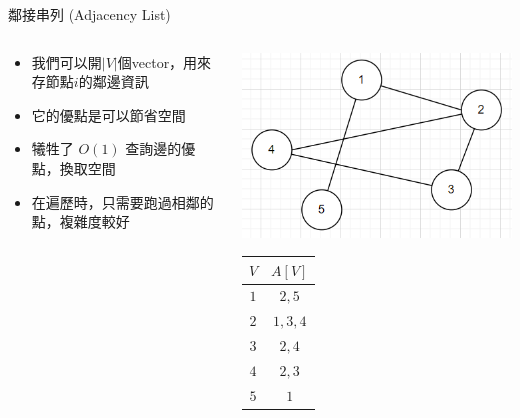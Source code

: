 \documentclass[aspectratio=169]{beamer}
\begin{document}
    \begin{frame}{鄰接串列 (Adjacency List)}
    \begin{columns}
    \begin{column}{0.6\textwidth}
        \begin{itemize}
            \item 我們可以開$|V|$個vector，用來存節點$i$的鄰邊資訊
            \item 它的優點是可以節省空間
            \item 犧牲了 $O(1)$ 查詢邊的優點，換取空間
            \item 在遍歷時，只需要跑過相鄰的點，複雜度較好
        \end{itemize}
    \end{column}
    \begin{column}{0.4\textwidth}
        \begin{center}
            \includegraphics[scale=0.3]{images/Adjacency Matrix.png}
        \end{center}
        \begin{center}
        \begin{tabular}{|c|c|}
                                \hline
            $V$ &  $A[V]$    \\ \hline
            $1$ &  $2, 5$    \\ \hline
            $2$ &  $1, 3, 4$ \\ \hline
            $3$ &  $2, 4$    \\ \hline
            $4$ &  $2, 3$    \\ \hline
            $5$ &  $1$       \\ \hline
        \end{tabular}
        \end{center}
    \end{column}
    \end{columns}
    \end{frame}
    
\end{document}
